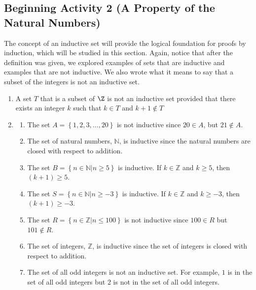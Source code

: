 \documentclass[11pt]{article}
\begin{document}
\hbreak

\newpage
\subsection*{Beginning Activity 2 \textbf{(A Property of the Natural Numbers)}}
The concept of an inductive set will provide the logical foundation for proofs by induction, which will be studied in this section.  Again, notice that after the definition was given, we explored examples of sets that are inductive and examples that are not inductive.  We also wrote what it means to say that a subset of the integers is not an inductive set.
\begin{enumerate}
  \item A set $T$ that is a subset of $\Z$ is not an inductive set provided that there exists an integer $k$ such that $k \in T$ and $k+1 \notin T$
\item \begin{enumerate}
\item The set  $A = \left\{ {1, 2, 3,  \ldots , 20} \right\}$  is not inductive since  
$20 \in A$, but $21 \notin A$.

\item The set of natural numbers, $\mathbb{N}$, is inductive since the natural numbers are closed with respect to addition.


\item The set  $B = \left\{ {\left. {n \in \mathbb{N}} \right| n \geq 5} \right\}$
 is inductive.  If  $k \in \mathbb{Z}$ and  $k \geq 5$, then  
$\left( {k + 1} \right) \geq 5$.

\item The set  $S = \left\{ {\left. {n \in \mathbb{N}} \right| n \geq  - 3} \right\}$
 is inductive.  If  $k \in \mathbb{Z}$ and  $k \geq  - 3$, then  
$\left( {k + 1} \right) \geq  - 3$.

\item The set  $R = \left\{ {n \in \mathbb{Z}\left| {n \leq 100} \right.} \right\}$
 is not inductive since $100 \in R$ but $101 \notin R$.

\item The set of integers, $\mathbb{Z}$, is inductive since  the set of integers is closed with respect to addition.
\item The set of all odd integers is not an inductive set.  For example, $1$ is in the set of all odd integers but 2 is not in the set of all odd integers.
\end{enumerate}



\end{enumerate}
\end{document}
